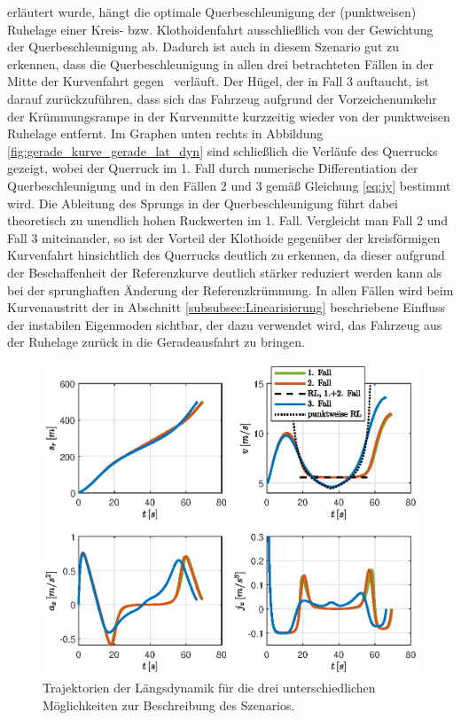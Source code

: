 erläutert wurde, hängt die optimale Querbeschleunigung der (punktweisen) Ruhelage einer Kreis- bzw. Klothoidenfahrt ausschließlich von der Gewichtung der Querbeschleunigung ab. Dadurch ist auch in diesem Szenario gut zu erkennen, dass die Querbeschleunigung in allen drei betrachteten Fällen in der Mitte der Kurvenfahrt gegen \ayRL~verläuft. Der \glqq Hügel\grqq, der in Fall 3 auftaucht, ist darauf zurückzuführen, dass sich das Fahrzeug aufgrund der Vorzeichenumkehr der Krümmungsrampe in der Kurvenmitte kurzzeitig wieder von der punktweisen Ruhelage entfernt. Im Graphen unten rechts in Abbildung \ref{fig:gerade_kurve_gerade_lat_dyn} sind schließlich die Verläufe des Querrucks gezeigt, wobei der Querruck im 1. Fall durch numerische Differentiation der Querbeschleunigung und in den Fällen 2 und 3 gemäß Gleichung \eqref{eq:jy} bestimmt wird. Die Ableitung des Sprungs in der Querbeschleunigung führt dabei theoretisch zu unendlich hohen Ruckwerten im 1. Fall. Vergleicht man Fall 2 und Fall 3 miteinander, so ist der Vorteil der Klothoide gegenüber der kreisförmigen Kurvenfahrt hinsichtlich des Querrucks deutlich zu erkennen, da dieser aufgrund der Beschaffenheit der Referenzkurve deutlich stärker reduziert werden kann als bei der sprunghaften Änderung der Referenzkrümmung. In allen Fällen wird beim Kurvenaustritt der in Abschnitt \ref{subsubsec:Linearisierung} beschriebene Einfluss der instabilen Eigenmoden sichtbar, der dazu verwendet wird, das Fahrzeug aus der Ruhelage zurück in die Geradeausfahrt zu bringen.
\begin{figure}[h] 
	\centering
	\includegraphics[width=\linewidth]{./Bilder/Ergebnisse/Gerade_Kurve_Gerade/svaj.eps}
	\caption{Trajektorien der Längsdynamik für die drei unterschiedlichen Möglichkeiten zur Beschreibung des Szenarios.}
	\label{fig:gerade_kurve_gerade_svaj}
\end{figure}  
